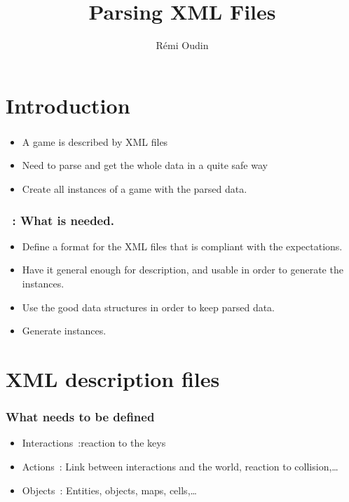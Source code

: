 \documentclass[a4paper, 11pt]{beamer}
\author{Rémi Oudin}
\title{Parsing XML Files}
\date{}
\institute{ENS Cachan}
\begin{document}
\begin{frame}
    \titlepage
\end{frame}

\section*{Introduction}

\begin{frame}
    \frametitle{\secname}
    \begin{itemize}
        \item A game is described by XML files
        \item Need to parse and get the whole data in a quite safe way
        \item Create all instances of a game with  the parsed data.
    \end{itemize}
\end{frame}

\begin{frame}
    \frametitle{\secname~: What is needed.}
    \begin{itemize}
        \item Define a format for the XML files that is compliant with the
            expectations.
        \item Have it general enough for description, and usable in order to
            generate the instances.
        \item Use the good data structures in order to keep parsed data.
        \item Generate instances.
    \end{itemize}
\end{frame}

\section{XML description files}

\begin{frame}
    \frametitle{What needs to be defined}
    \begin{itemize}
        \item Interactions~:reaction to the keys
        \item Actions~: Link between interactions and the world, reaction to
            collision,\dots
        \item Objects~: Entities, objects, maps, cells,\dots
    \end{itemize}
\end{frame}
\end{document}
